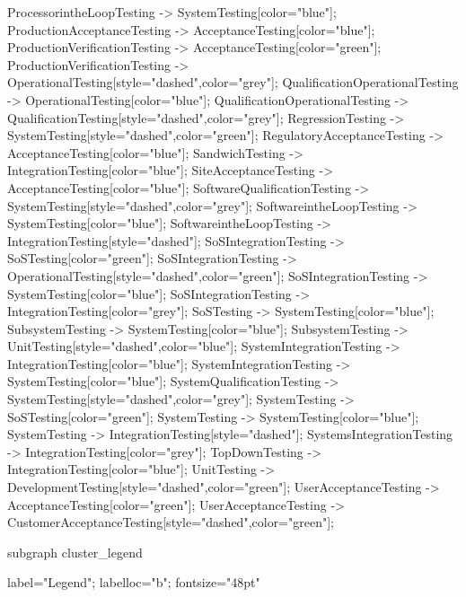 \documentclass{article}
\begin{document}
{ProcessorintheLoopTesting -> SystemTesting[color="blue"];
ProductionAcceptanceTesting -> AcceptanceTesting[color="blue"];
ProductionVerificationTesting -> AcceptanceTesting[color="green"];
ProductionVerificationTesting -> OperationalTesting[style="dashed",color="grey"];
QualificationOperationalTesting -> OperationalTesting[color="blue"];
QualificationOperationalTesting -> QualificationTesting[style="dashed",color="grey"];
RegressionTesting -> SystemTesting[style="dashed",color="green"];
RegulatoryAcceptanceTesting -> AcceptanceTesting[color="blue"];
SandwichTesting -> IntegrationTesting[color="blue"];
SiteAcceptanceTesting -> AcceptanceTesting[color="blue"];
SoftwareQualificationTesting -> SystemTesting[style="dashed",color="grey"];
SoftwareintheLoopTesting -> SystemTesting[color="blue"];
SoftwareintheLoopTesting -> IntegrationTesting[style="dashed"];
SoSIntegrationTesting -> SoSTesting[color="green"];
SoSIntegrationTesting -> OperationalTesting[style="dashed",color="green"];
SoSIntegrationTesting -> SystemTesting[color="blue"];
SoSIntegrationTesting -> IntegrationTesting[color="grey"];
SoSTesting -> SystemTesting[color="blue"];
SubsystemTesting -> SystemTesting[color="blue"];
SubsystemTesting -> UnitTesting[style="dashed",color="blue"];
SystemIntegrationTesting -> IntegrationTesting[color="blue"];
SystemIntegrationTesting -> SystemTesting[color="blue"];
SystemQualificationTesting -> SystemTesting[style="dashed",color="grey"];
SystemTesting -> SoSTesting[color="green"];
SystemTesting -> SystemTesting[color="blue"];
SystemTesting -> IntegrationTesting[style="dashed"];
SystemsIntegrationTesting -> IntegrationTesting[color="grey"];
TopDownTesting -> IntegrationTesting[color="blue"];
UnitTesting -> DevelopmentTesting[style="dashed",color="green"];
UserAcceptanceTesting -> AcceptanceTesting[color="green"];
UserAcceptanceTesting -> CustomerAcceptanceTesting[style="dashed",color="green"];

subgraph cluster_legend {

    label="Legend";
    labelloc="b";
    fontsize="48pt"

}}
\end{document}
